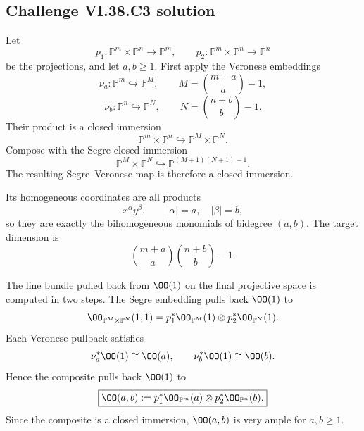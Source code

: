 \subsection*{Challenge VI.38.C3 solution}
\begin{solution}
Let
\[
p_1:\mathbb P^m\times\mathbb P^n\to\mathbb P^m,
\qquad
p_2:\mathbb P^m\times\mathbb P^n\to\mathbb P^n
\]
be the projections, and let \(a,b\ge1\). First apply the Veronese embeddings
\[
\nu_a:\mathbb P^m\hookrightarrow\mathbb P^{M},
\qquad
M=\binom{m+a}{a}-1,
\]
\[
\nu_b:\mathbb P^n\hookrightarrow\mathbb P^{N},
\qquad
N=\binom{n+b}{b}-1.
\]
Their product is a closed immersion
\[
\mathbb P^m\times\mathbb P^n
\hookrightarrow
\mathbb P^M\times\mathbb P^N.
\]
Compose with the Segre closed immersion
\[
\mathbb P^M\times\mathbb P^N
\hookrightarrow
\mathbb P^{(M+1)(N+1)-1}.
\]
The resulting Segre--Veronese map is therefore a closed immersion.

Its homogeneous coordinates are all products
\[
x^\alpha y^\beta,
\qquad
|\alpha|=a,
\quad
|\beta|=b,
\]
so they are exactly the bihomogeneous monomials of bidegree \((a,b)\). The target
dimension is
\[
\boxed{
\binom{m+a}{a}\binom{n+b}{b}-1
}.
\]

The line bundle pulled back from \(\OO(1)\) on the final projective space is
computed in two steps. The Segre embedding pulls back \(\OO(1)\) to
\[
\OO_{\mathbb P^M\times\mathbb P^N}(1,1)
=p_1^*\OO_{\mathbb P^M}(1)\otimes p_2^*\OO_{\mathbb P^N}(1).
\]
Each Veronese pullback satisfies
\[
\nu_a^*\OO(1)\cong\OO(a),
\qquad
\nu_b^*\OO(1)\cong\OO(b).
\]
Hence the composite pulls back \(\OO(1)\) to
\[
\boxed{
\OO(a,b)
:=p_1^*\OO_{\mathbb P^m}(a)\otimes p_2^*\OO_{\mathbb P^n}(b).
}
\]
Since the composite is a closed immersion, \(\OO(a,b)\) is very ample for
\(a,b\ge1\).
\end{solution}

